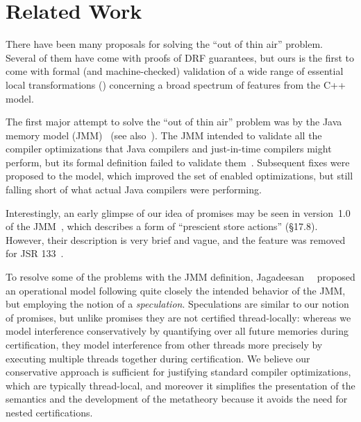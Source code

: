 \section{Related Work}\label{sec:related}


There have been many proposals for solving the ``out of thin air''
problem.  Several of them have come with proofs of DRF guarantees, but
ours is the first to come with formal (and machine-checked) validation
of a wide range of essential local transformations
() concerning a broad spectrum of features
from the C++ model.


The first major attempt to solve the ``out of thin air'' problem was by the Java memory model (JMM)~\cite{jmm} (see also~\cite{Lochbihler2014TOPLAS}).
The JMM intended to validate all the compiler optimizations that Java compilers and just-in-time compilers might perform,
but its formal definition failed to validate them~\cite{sevcik:jmm}.
Subsequent fixes were proposed to the model, which improved the set of enabled optimizations, 
but still falling short of what actual Java compilers were performing.

Interestingly, an early glimpse of our idea of promises may be seen in
version~1.0 of the JMM~\cite{jmm-1.0}, which describes a form of
``prescient store actions'' (\S{17.8}).  However, their description is
very brief and vague, and the feature was removed for JSR
133~\cite{jsr133}.

To resolve some of the problems with the JMM definition,
\mbox{Jagadeesan~\etal}~\cite{Jagadeesan2010} proposed an operational
model following quite closely the intended behavior of the JMM, but
employing the notion of a \emph{speculation}.  Speculations are
similar to our notion of promises, but unlike promises they are not
certified thread-locally: whereas we model interference conservatively
by quantifying over all future memories during certification, they
model interference from other threads more precisely by executing
multiple threads together during certification.  We believe our
conservative approach is sufficient for justifying standard compiler
optimizations, which are typically thread-local, and moreover it
simplifies the presentation of the semantics and the development of
the metatheory because it avoids the need for nested certifications.

